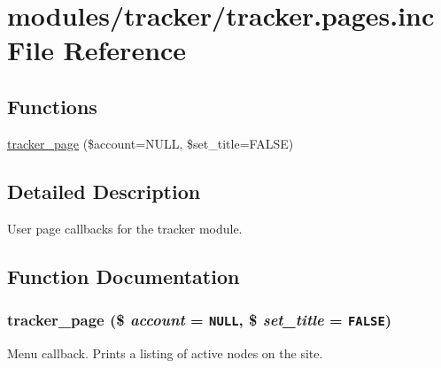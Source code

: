 \hypertarget{tracker_8pages_8inc}{
\section{modules/tracker/tracker.pages.inc File Reference}
\label{tracker_8pages_8inc}
}
\subsection*{Functions}
\begin{CompactItemize}
\item 
\hyperlink{tracker_8pages_8inc_7ba726633c43324ec58dd1aa4ec999e4}{tracker\_\-page} (\$account=NULL, \$set\_\-title=FALSE)
\end{CompactItemize}


\subsection{Detailed Description}
User page callbacks for the tracker module. 

\subsection{Function Documentation}
\hypertarget{tracker_8pages_8inc_7ba726633c43324ec58dd1aa4ec999e4}{
\subsubsection[{tracker\_\-page}]{\setlength{\rightskip}{0pt plus 5cm}tracker\_\-page (\$ {\em account} = {\tt NULL}, \/  \$ {\em set\_\-title} = {\tt FALSE})}}
\label{tracker_8pages_8inc_7ba726633c43324ec58dd1aa4ec999e4}


Menu callback. Prints a listing of active nodes on the site. 
